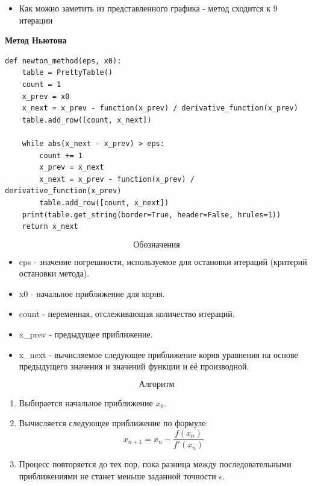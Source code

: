\documentclass{article}
\begin{document}
\begin{itemize}
    \item Как можно заметить из представленного графика - метод сходится к 9 итерации
\end{itemize} 

\textbf{\large{Метод Ньютона}} 
\begin{lstlisting}
def newton_method(eps, x0):
    table = PrettyTable()
    count = 1
    x_prev = x0
    x_next = x_prev - function(x_prev) / derivative_function(x_prev)
    table.add_row([count, x_next])
    
    while abs(x_next - x_prev) > eps:
        count += 1
        x_prev = x_next
        x_next = x_prev - function(x_prev) / derivative_function(x_prev)
        table.add_row([count, x_next])
    print(table.get_string(border=True, header=False, hrules=1))
    return x_next

\end{lstlisting}
$$\textbf{Обозначения}$$
\begin{itemize}
    \item eps - значение погрешности, используемое для остановки итераций (критерий остановки метода).
    \item x0 - начальное приближение для корня.
    \item count - переменная, отслеживающая количество итераций.
    \item x\_prev - предыдущее приближение.
    \item x\_next - вычисляемое следующее приближение корня уравнения на основе предыдущего значения и значений функции и её производной.

\end{itemize}

$$\textbf{Алгоритм}$$
\begin{enumerate}
    \item Выбирается начальное приближение \( x_0 \).
    \item Вычисляется следующее приближение по формуле:
    \[
    x_{n+1} = x_n - \frac{f(x_n)}{f'(x_n)}
    \]
    \item Процесс повторяется до тех пор, пока разница между последовательными приближениями не станет меньше заданной точности \( \epsilon \).
\end{enumerate}
\end{document}
